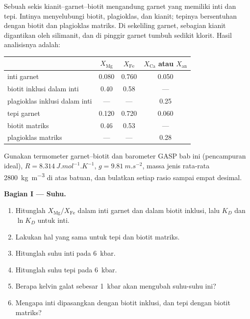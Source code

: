 \begin{problem}
\label{pb:b2:pt-paths:1}
Sebuah sekis kianit--garnet--biotit mengandung garnet yang memiliki inti dan tepi. Intinya menyelubungi
biotit, plagioklas, dan kianit; tepinya bersentuhan dengan biotit dan plagioklas
matriks. Di sekeliling garnet, sebagian kianit digantikan oleh silimanit, dan di pinggir
garnet tumbuh sedikit klorit. Hasil analisisnya adalah:
\begin{center}
\small
\begin{tabular}{@{}lccc@{}}
\hline
 & $X_{\text{Mg}}$ & $X_{\text{Fe}}$ & $X_{\text{Ca}}$ atau $X_{\text{an}}$\\
\hline
inti garnet & 0.080 & 0.760 & 0.050\\
biotit inklusi dalam inti & 0.40 & 0.58 & ---\\
plagioklas inklusi dalam inti & --- & --- & 0.25\\
tepi garnet & 0.120 & 0.720 & 0.060\\
biotit matriks & 0.46 & 0.53 & ---\\
plagioklas matriks & --- & --- & 0.28\\
\hline
\end{tabular}
\end{center}
Gunakan termometer garnet--biotit dan barometer GASP bab ini (pencampuran ideal),
$R = \qty{8.314}{J.mol^{-1}.K^{-1}}$, $g = \qty{9.81}{m.s^{-2}}$, massa jenis rata-rata
\qty{2800}{kg.m^{-3}} di atas batuan, dan bulatkan setiap rasio sampai empat desimal.

\noindent\textbf{Bagian I --- Suhu.}
\begin{enumerate}
\item Hitunglah $X_{\text{Mg}}/X_{\text{Fe}}$ dalam inti garnet dan dalam biotit
inklusi, lalu $K_D$ dan $\ln K_D$ untuk inti.
\item Lakukan hal yang sama untuk tepi dan biotit matriks.
\item Hitunglah suhu inti pada \qty{6}{kbar}.
\item Hitunglah suhu tepi pada \qty{6}{kbar}.
\item Berapa kelvin galat sebesar \qty{1}{kbar} akan mengubah suhu-suhu ini?
\item Mengapa inti dipasangkan dengan biotit inklusi, dan tepi dengan biotit
matriks?
\end{enumerate}


\end{problem}
